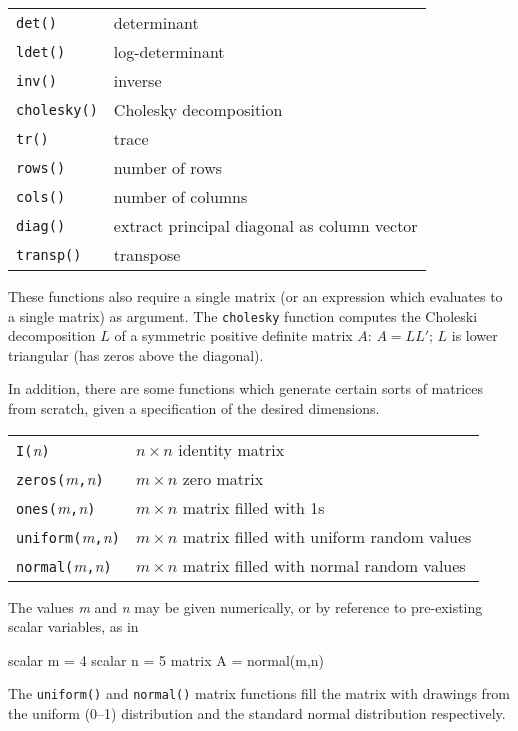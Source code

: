 \begin{center}
\begin{tabular}{ll}
\texttt{det()} & determinant \\
\texttt{ldet()} & log-determinant \\
\texttt{inv()} & inverse \\
\texttt{cholesky()} & Cholesky decomposition \\
\texttt{tr()} & trace \\
\texttt{rows()} & number of rows \\
\texttt{cols()} & number of columns \\
\texttt{diag()} & extract principal diagonal as column vector \\
\texttt{transp()} & transpose 
\end{tabular}
\end{center}

These functions also require a single matrix (or an expression which
evaluates to a single matrix) as argument.  The \texttt{cholesky}
function computes the Choleski decomposition $L$ of a symmetric
positive definite matrix $A$: $A = LL'$; $L$ is lower triangular (has
zeros above the diagonal).

In addition, there are some functions which generate certain sorts of
matrices from scratch, given a specification of the desired
dimensions.

\begin{center}
\begin{tabular}{ll}
\texttt{I(}\textsl{n}\texttt{)} & $n\times n$ identity matrix \\
\texttt{zeros(}\textsl{m}\texttt{,}\textsl{n}\texttt{)} & 
   $m\times n$ zero matrix \\
\texttt{ones(}\textsl{m}\texttt{,}\textsl{n}\texttt{)} &
   $m\times n$ matrix filled with 1s \\
\texttt{uniform(}\textsl{m}\texttt{,}\textsl{n}\texttt{)} &
   $m\times n$ matrix filled with uniform random values \\
\texttt{normal(}\textsl{m}\texttt{,}\textsl{n}\texttt{)} &
   $m\times n$ matrix filled with normal random values \\
\end{tabular}
\end{center}

The values \textsl{m} and \textsl{n} may be given numerically, or by
reference to pre-existing scalar variables, as in
%
\begin{code}
scalar m = 4
scalar n = 5
matrix A = normal(m,n)
\end{code}
%
The \texttt{uniform()} and \texttt{normal()} matrix functions fill the
matrix with drawings from the uniform (0--1) distribution and the
standard normal distribution respectively.

